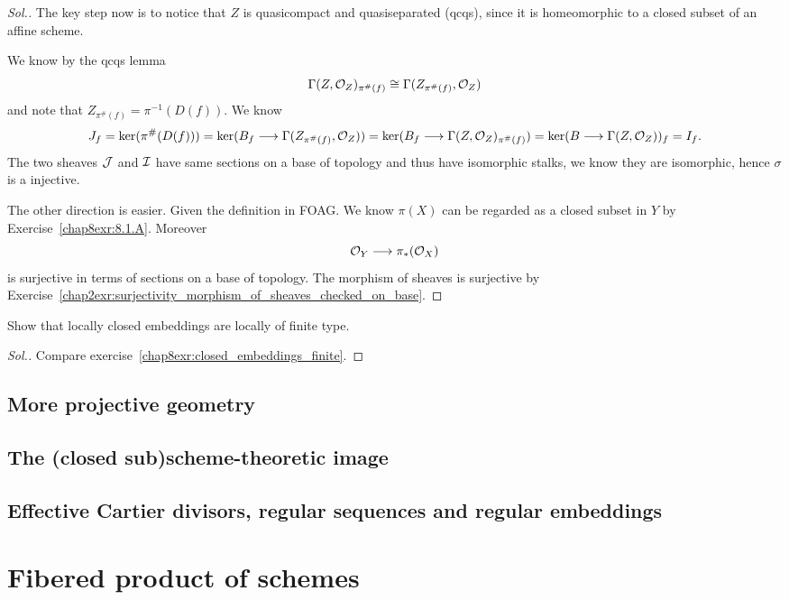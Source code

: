 \documentclass[11pt]{book} %
\begin{document}
\begin{proof}[Sol.]
The key step now is to notice that $Z$ is quasicompact and quasiseparated (qcqs), since it is homeomorphic to a closed subset of an affine scheme.

We know by the qcqs lemma 
$$
\Gamma(Z,{\cal O}_Z)_{\pi^\#(f)}\cong \Gamma(Z_{\pi^\#(f)},{\cal O}_Z)
$$ 
and note that $Z_{\pi^\#(f)}=\pi^{-1}(D(f))$. We know 
$$
J_f=\ker(\pi^\#(D(f)))=\ker(B_f\longrightarrow \Gamma(Z_{\pi^\#(f)},{\cal O}_Z))=\ker(B_f\longrightarrow \Gamma(Z,{\cal O}_Z)_{\pi^\#(f)})=\ker(B\longrightarrow \Gamma(Z,{\cal O}_Z))_{f}=I_f.
$$
The two sheaves ${\cal J}$ and ${\cal I}$ have same sections on a base of topology and thus have isomorphic stalks,  we know they are isomorphic, hence $\sigma$ is a injective. 

The other direction is easier. Given  the definition in FOAG. We know $\pi(X)$ can be regarded as a closed subset in $Y$ by Exercise~\ref{chap8exr:8.1.A}. Moreover
$$
{\cal O}_Y\longrightarrow \pi_*({\cal O}_X)
$$
is surjective in terms of sections on a base of topology. The morphism of sheaves is surjective by Exercise~\ref{chap2exr:surjectivity_morphism_of_sheaves_checked_on_base}.
\end{proof}
\begin{exr}
Show that locally closed embeddings are locally of finite type.
\end{exr}
\begin{proof}[Sol.]
Compare exercise~\ref{chap8exr:closed_embeddings_finite}.
\end{proof}
\section{More projective geometry}
\section{The (closed sub)scheme-theoretic image}
\section{Effective Cartier divisors, regular sequences and regular embeddings}
\chapter{Fibered product of schemes}
\end{document}
